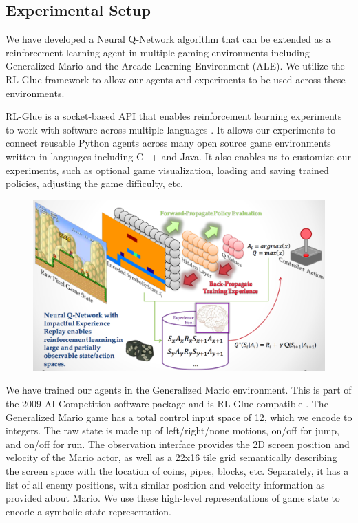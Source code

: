 \documentclass{article}
\begin{document}
\subsection{Experimental Setup}

We have developed a Neural Q-Network algorithm that can be extended as a reinforcement learning agent in multiple gaming environments including Generalized Mario and the Arcade Learning Environment (ALE). We utilize the RL-Glue framework to allow our agents and experiments to be used across these environments.

RL-Glue is a socket-based API that enables reinforcement learning experiments to work with software across multiple languages \cite{Tanner09}. It allows our experiments to connect reusable Python agents across many open source game environments written in languages including C++ and Java. It also enables us to customize our experiments, such as optional game visualization, loading and saving trained policies, adjusting the game difficulty, etc.

 \begin{figure}
 \begin{center}
\includegraphics[scale=0.19]{main_figure.png}
\end{center}
\end{figure}

We have trained our agents in the Generalized Mario environment. This is part of the 2009 AI Competition software package and is RL-Glue compatible \cite{Togelius10}. The Generalized Mario game has a total control input space of 12, which we encode to integers. The raw state is made up of left/right/none motions, on/off for jump, and on/off for run. The observation interface provides the 2D screen position and velocity of the Mario actor, as well as a 22x16 tile grid semantically describing the screen space with the location of coins, pipes, blocks, etc. Separately, it has a list of all enemy positions, with similar position and velocity information as provided about Mario. We use these high-level representations of game state to encode a symbolic state representation.
\end{document}
